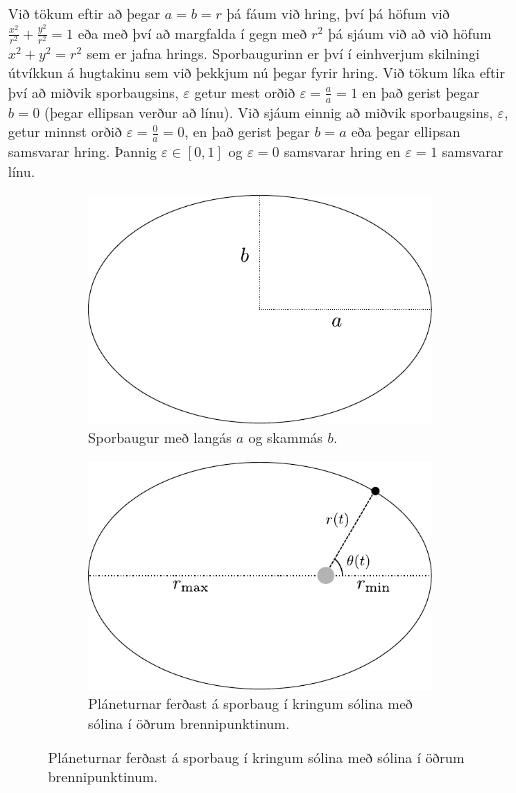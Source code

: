 Við tökum eftir að þegar $a = b = r$ þá fáum við hring, því þá höfum við $\frac{x^2}{r^2}+ \frac{y^2}{r^2} = 1$ eða með því að margfalda í gegn með $r^2$ þá sjáum við að við höfum $x^2 + y^2 = r^2$ sem er jafna hrings. Sporbaugurinn er því í einhverjum skilningi útvíkkun á hugtakinu sem við þekkjum nú þegar fyrir hring. Við tökum líka eftir því að miðvik sporbaugsins, $\varepsilon$ getur mest orðið $\varepsilon = \frac{a}{a} = 1$ en það gerist þegar $b = 0$ (þegar ellipsan verður að línu). Við sjáum einnig að miðvik sporbaugsins, $\varepsilon$, getur minnst orðið $\varepsilon = \frac{0}{a} = 0$, en það gerist þegar $b = a$ eða þegar ellipsan samsvarar hring. Þannig $\varepsilon \in [0,1]$ og $\varepsilon = 0$ samsvarar hring en $\varepsilon = 1$ samsvarar línu. 

\begin{figure}[H]
    \centering
\begin{subfigure}[h]{.4\textwidth}
    \centering
    \includegraphics[width=\linewidth]{figures/ellipse1.pdf}
    \caption{Sporbaugur með langás $a$ og skammás $b$.}
    \label{fig:ellipse}
\end{subfigure}
\hfill
\begin{subfigure}[h]{.4\textwidth}
    \centering
    \includegraphics[width=\linewidth]{figures/keplerfirstlaw}
    \caption{Pláneturnar ferðast á sporbaug í kringum sólina með sólina í öðrum brennipunktinum.}
    \label{subfig:FirstKepler}
\end{subfigure}
\end{figure}


